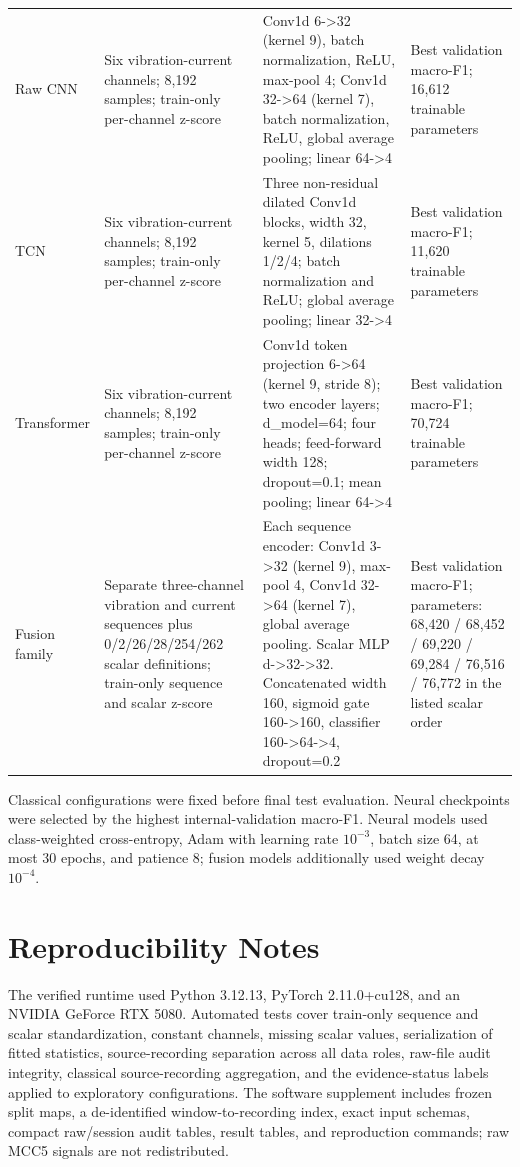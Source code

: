 \documentclass[11pt]{article}
\begin{document}
\begin{longtable}{>{\raggedright\arraybackslash}p{2.0cm} >{\raggedright\arraybackslash}p{2.4cm} >{\raggedright\arraybackslash}p{7.4cm} >{\raggedright\arraybackslash}p{3.2cm}}
Raw CNN & Six vibration-current channels; 8,192 samples; train-only per-channel z-score & Conv1d 6->32 (kernel 9), batch normalization, ReLU, max-pool 4; Conv1d 32->64 (kernel 7), batch normalization, ReLU, global average pooling; linear 64->4 & Best validation macro-F1; 16,612 trainable parameters \\
TCN & Six vibration-current channels; 8,192 samples; train-only per-channel z-score & Three non-residual dilated Conv1d blocks, width 32, kernel 5, dilations 1/2/4; batch normalization and ReLU; global average pooling; linear 32->4 & Best validation macro-F1; 11,620 trainable parameters \\
Transformer & Six vibration-current channels; 8,192 samples; train-only per-channel z-score & Conv1d token projection 6->64 (kernel 9, stride 8); two encoder layers; d\_model=64; four heads; feed-forward width 128; dropout=0.1; mean pooling; linear 64->4 & Best validation macro-F1; 70,724 trainable parameters \\
Fusion family & Separate three-channel vibration and current sequences plus 0/2/26/28/254/262 scalar definitions; train-only sequence and scalar z-score & Each sequence encoder: Conv1d 3->32 (kernel 9), max-pool 4, Conv1d 32->64 (kernel 7), global average pooling. Scalar MLP d->32->32. Concatenated width 160, sigmoid gate 160->160, classifier 160->64->4, dropout=0.2 & Best validation macro-F1; parameters: 68,420 / 68,452 / 69,220 / 69,284 / 76,516 / 76,772 in the listed scalar order \\
\end{longtable}
\noindent\footnotesize Classical configurations were fixed before final test evaluation. Neural checkpoints were selected by the highest internal-validation macro-F1. Neural models used class-weighted cross-entropy, Adam with learning rate $10^{-3}$, batch size 64, at most 30 epochs, and patience 8; fusion models additionally used weight decay $10^{-4}$.
\endgroup


\section{Reproducibility Notes}
The verified runtime used Python 3.12.13, PyTorch 2.11.0+cu128, and an NVIDIA GeForce RTX 5080. Automated tests cover train-only sequence and scalar standardization, constant channels, missing scalar values, serialization of fitted statistics, source-recording separation across all data roles, raw-file audit integrity, classical source-recording aggregation, and the evidence-status labels applied to exploratory configurations. The software supplement includes frozen split maps, a de-identified window-to-recording index, exact input schemas, compact raw/session audit tables, result tables, and reproduction commands; raw MCC5 signals are not redistributed.
\end{document}
